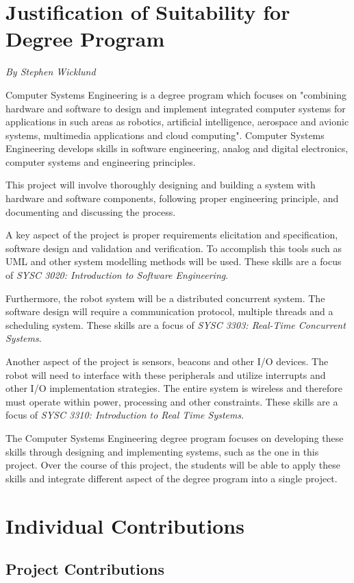 \documentclass[12pt]{report}
\newcommand{\sectionAuthor}[1]{{\small\vspace{-1em}\textit{#1}}\bigskip\par}
\begin{document}
\section{Justification of Suitability for Degree Program}
\sectionAuthor{By Stephen Wicklund}
Computer Systems Engineering is a degree program which focuses on "combining hardware and software to design and implement integrated computer systems for applications in such areas as robotics, artificial intelligence, aerospace and avionic systems, multimedia applications and cloud computing". Computer Systems Engineering develops skills in software engineering, analog and digital electronics, computer systems and engineering principles.

This project will involve thoroughly designing and building a system with hardware and software components, following proper engineering principle, and documenting and discussing the process.

A key aspect of the project is proper requirements elicitation and specification, software design and validation and verification. To accomplish this tools such as UML and other system modelling methods will be used. These skills are a focus of \textit{SYSC 3020: Introduction to Software Engineering}.

Furthermore, the robot system will be a distributed concurrent system. The software design will require a communication protocol, multiple threads and a scheduling system. These skills are a focus of \textit{SYSC 3303: Real-Time Concurrent Systems}.

Another aspect of the project is sensors, beacons and other I/O devices. The robot will need to interface with these peripherals and utilize interrupts and other I/O implementation strategies. The entire system is wireless and therefore must operate within power, processing and other constraints. These skills are a focus of \textit{SYSC 3310: Introduction to Real Time Systems}.

The Computer Systems Engineering degree program focuses on developing these skills through designing and implementing systems, such as the one in this project. Over the course of this project, the students will be able to apply these skills and integrate different aspect of the degree program into a single project.

\section{Individual Contributions}
\subsection{Project Contributions}
\end{document}
